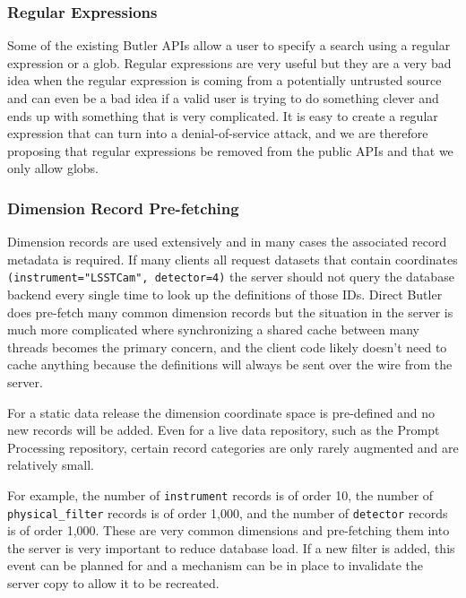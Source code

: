 \subsubsection{Regular Expressions}\label{regular-expressions}

Some of the existing Butler APIs allow a user to specify a search using a regular expression or a glob.
Regular expressions are very useful but they are a very bad idea when the regular expression is coming from a potentially untrusted source and can even be a bad idea if a valid user is trying to do something clever and ends up with something that is very complicated.
It is easy to create a regular expression that can turn into a denial-of-service attack, and we are therefore proposing that regular expressions be removed from the public APIs and that we only allow globs.

\subsubsection{Dimension Record Pre-fetching}\label{dimension-record-pre-fetching}

Dimension records are used extensively and in many cases the associated record metadata is required.
If many clients all request datasets that contain coordinates \texttt{(instrument="LSSTCam", detector=4)} the server should not query the database backend every single time to look up the definitions of those IDs.
Direct Butler does pre-fetch many common dimension records but the situation in the server is much more complicated where synchronizing a shared cache between many threads becomes the primary concern, and the client code likely doesn't need to cache anything because the definitions will always be sent over the wire from the server.

For a static data release the dimension coordinate space is pre-defined and no new records will be added.
Even for a live data repository, such as the Prompt Processing repository, certain record categories are only rarely augmented and are relatively small.

For example, the number of \texttt{instrument} records is of order 10, the number of \texttt{physical\_filter} records is of order 1,000, and the number of \texttt{detector} records is of order 1,000.
These are very common dimensions and pre-fetching them into the server is very important to reduce database load.
If a new filter is added, this event can be planned for and a mechanism can be in place to invalidate the server copy to allow it to be recreated.

